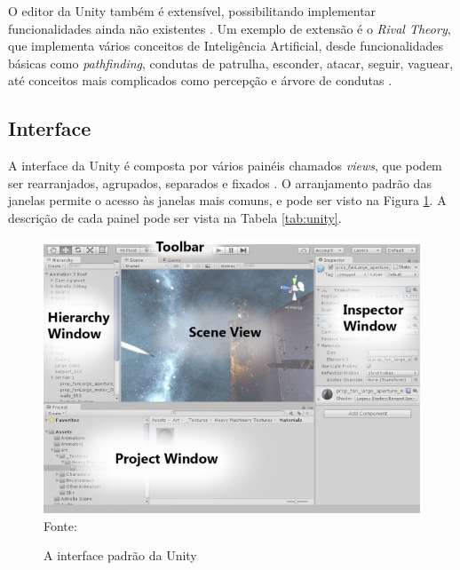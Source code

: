 \documentclass[
	12pt,					%
	openright,				%
	oneside,				%
	a4paper,				%
	bibjustif,				%
	chapter=TITLE,			%
	english,				%
	brazil,					%
	]{abntex2}
\newcommand{\source}[1]{\small Fonte: {#1}}
\begin{document}
		O editor da Unity também é extensível, possibilitando implementar funcionalidades ainda não existentes
		\cite{unitySite}.
		Um exemplo de extensão é o \textit{Rival Theory},
		que implementa vários conceitos de Inteligência Artificial,
		desde funcionalidades básicas como \textit{pathfinding},
		condutas de patrulha, esconder, atacar, seguir, vaguear,
		até conceitos mais complicados como percepção e árvore de condutas
		\cite{rivalTheory}.
		
		\FloatBarrier
		\subsection{Interface}
			A interface da Unity é composta por vários painéis chamados \textit{views},
			que podem ser rearranjados, agrupados, separados e fixados
			\cite{unityInterface}.
			O arranjamento padrão das janelas permite o acesso às janelas mais comuns,
			e pode ser visto na Figura \ref{fig:interfaceUnity}.
			A descrição de cada painel pode ser vista na Tabela \ref{tab:unity}.
			
			\begin{figure}[ht!]
				\caption{A interface padrão da Unity}
				\centering
				\includegraphics[scale=0.5]{img/InterfaceUnity.jpg}\\
				\vspace{0.5mm}
				\source{}
				\label{fig:interfaceUnity}
			\end{figure}
			
\end{document}
